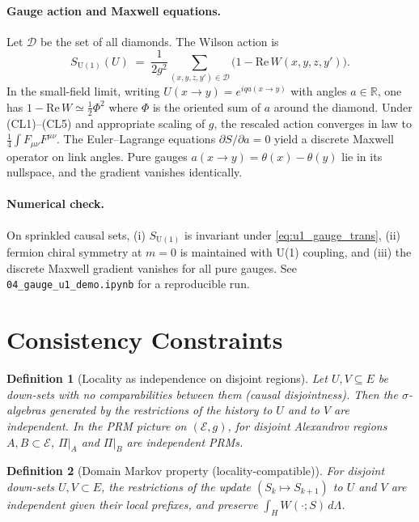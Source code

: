 \documentclass[12pt,a4paper]{article}
\newtheorem{definition}{Definition}
\begin{document}
\paragraph{Gauge action and Maxwell equations.}
Let $\mathcal D$ be the set of all diamonds. The Wilson action is
\begin{equation}\label{eq:wilson_action}
  S_{\mathrm{U(1)}}(U)\;=\;\frac{1}{2g^2}\sum_{(x,y,z,y')\in\mathcal D}\big(1-\mathrm{Re}\,W(x,y,z,y')\big).
\end{equation}
In the small-field limit, writing $U(x\!\to\!y)=e^{iq a(x\!\to\!y)}$ with angles $a\in\mathbb R$,
one has $1-\mathrm{Re}\,W\simeq \tfrac12 \Phi^2$ where $\Phi$ is the oriented sum of $a$ around the diamond.
Under \textnormal{(CL1)--(CL5)} and appropriate scaling of $g$, the rescaled action converges in law to $\tfrac14\!\int F_{\mu\nu}F^{\mu\nu}$.
The Euler--Lagrange equations $\partial S/\partial a=0$ yield a discrete Maxwell operator on link angles.
Pure gauges $a(x\!\to\!y)=\theta(x)-\theta(y)$ lie in its nullspace, and the gradient vanishes identically.

\paragraph{Numerical check.}
On sprinkled causal sets, (i) $S_{\mathrm{U(1)}}$ is invariant under \eqref{eq:u1_gauge_trans}, (ii) fermion chiral symmetry 
at $m{=}0$ is maintained with U(1) coupling, and (iii) the discrete Maxwell gradient vanishes for all pure gauges.
See \texttt{04\_gauge\_u1\_demo.ipynb} for a reproducible run.


\section{Consistency Constraints}\label{sec:consistency}

\begin{definition}[Locality as independence on disjoint regions]
Let $U,V\subseteq E$ be down-sets with no comparabilities between them (causal disjointness).
Then the $\sigma$-algebras generated by the restrictions of the history to $U$ and to $V$
are independent. In the PRM picture on $(\mathcal E,g)$, for disjoint Alexandrov regions
$A,B\subset \mathcal E$, $\Pi|_{A}$ and $\Pi|_{B}$ are independent PRMs.
\end{definition}

\begin{definition}[Domain Markov property (locality-compatible)]
For disjoint down-sets $U,V\subset E$, the restrictions of the update
$(S_k\mapsto S_{k+1})$ to $U$ and $V$ are independent given their local prefixes, and preserve $\int_H W(\cdot;S)\,d\Lambda$.
\end{definition}
\end{document}
